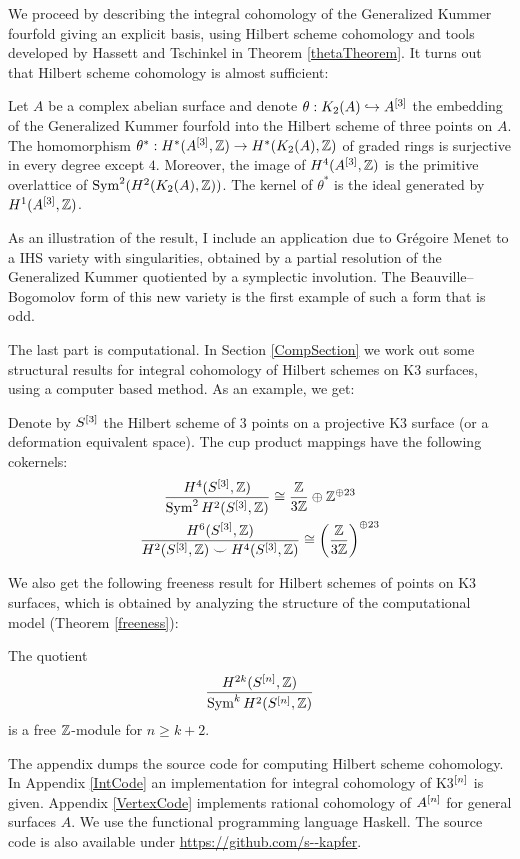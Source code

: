 We proceed by describing the integral cohomology of the Generalized Kummer fourfold giving an explicit basis, using Hilbert scheme cohomology and tools developed by Hassett and Tschinkel in Theorem \ref{thetaTheorem}. It turns out that Hilbert scheme cohomology is almost sufficient:
\begin{theorem}
Let $A$ be a complex abelian surface and denote $\theta: \kum{A}{2}\hookrightarrow A^{[3]}$ the embedding of the Generalized Kummer fourfold into the Hilbert scheme of three points on $A$.
The homomorphism $\theta^*:H^*(A\hilb{3},\Z)\rightarrow H^*(\kum{A}{2},\Z)$ of graded rings is surjective in every degree except $4$. Moreover, the image of $H^4(A\hilb{3},\Z)$ is the primitive overlattice of $\Sym^2(H^2(\kum{A}{2},\Z))$. 
The kernel of $\theta^*$ is the ideal generated by $H^1(A\hilb{3},\Z)$.
\end{theorem}
As an illustration of the result, I include an application due to Gr\'egoire Menet to a IHS variety with singularities, obtained by a partial resolution of the Generalized Kummer quotiented by a symplectic involution. The Beauville--Bogomolov form of this new variety is the first example of such a form that is odd.

The last part \cite{Kapfer2} is computational. In Section \ref{CompSection} we work out some structural results for integral cohomology of Hilbert schemes on K3 surfaces, using a computer based method. As an example, we get:
\begin{theorem}
Denote by $S\hilb{3}$ the Hilbert scheme of 3 points on a projective K3 surface (or a deformation equivalent space).
The cup product mappings have the following cokernels:
\begin{gather}
\frac{H^4(S\hilb{3},\IZ)}{\Sym^2 H^2(S\hilb{3},\IZ)}  \cong \frac{\IZ}{3\IZ} \oplus \IZ^ {\oplus 23}\\
\frac{H^6(S\hilb{3},\IZ)}{H^2(S\hilb{3},\IZ)\smile H^4(S\hilb{3},\IZ)} \cong \left(\frac{\IZ}{3\IZ}\right)^{\oplus 23}
\end{gather}
\end{theorem}
We also get the following freeness result for Hilbert schemes of points on K3 surfaces, which is obtained by analyzing the structure of the computational model (Theorem \ref{freeness}):
\begin{theorem}
The quotient
$$
 \frac{H^{2k}(S\hilb{n},\IZ)}{\Sym^k H^{2}(S\hilb{n},\IZ)}
$$
is a free $\IZ$-module for $n\geq k+2$.
\end{theorem}

The appendix dumps the source code for computing Hilbert scheme cohomology. In Appendix \ref{IntCode} an implementation for integral cohomology of K3$\hilb{n}$ is given. 
Appendix \ref{VertexCode} implements rational cohomology of $A\hilb{n}$ for general surfaces $A$. 
We use the functional programming language Haskell. 
The source code is also available under \url{https://github.com/s--kapfer}.
\vspace{5pt}

